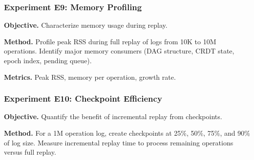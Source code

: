 
\subsubsection{Experiment E9: Memory Profiling}
\textbf{Objective.} Characterize memory usage during replay.

\textbf{Method.} Profile peak RSS during full replay of logs from 10K to 10M operations. Identify major memory consumers (DAG structure, CRDT state, epoch index, pending queue).

\textbf{Metrics.} Peak RSS, memory per operation, growth rate.



\subsubsection{Experiment E10: Checkpoint Efficiency}
\textbf{Objective.} Quantify the benefit of incremental replay from checkpoints.

\textbf{Method.} For a 1M operation log, create checkpoints at 25\%, 50\%, 75\%, and 90\% of log size. Measure incremental replay time to process remaining operations versus full replay.

